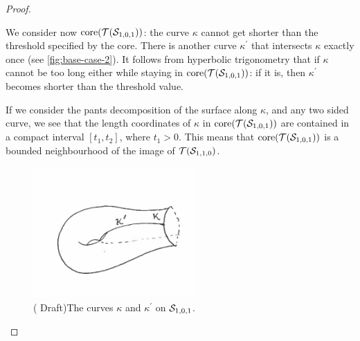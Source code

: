 \documentclass[12pt, reqno]{amsart}
\begin{document}
\begin{proof}
\begin{itemize}
    We consider now $\mathrm{core}(\mathcal{T}(\mathcal{S}_{1,0,1}))$: the curve $\kappa$ cannot get shorter than the threshold specified by the core.
    There is another curve $\kappa^{\prime}$ that intersects $\kappa$ exactly once (see \autoref{fig:base-case-2}).
    It follows from hyperbolic trigonometry that if $\kappa$ cannot be too long either while staying in $\mathrm{core}(\mathcal{T}(\mathcal{S}_{1,0,1}))$: if it is, then $\kappa^{\prime}$ becomes shorter than the threshold value.

    If we consider the pants decomposition of the surface along $\kappa$, and any two sided curve, we see that the length coordinates of $\kappa$ in $\mathrm{core}(\mathcal{T}(\mathcal{S}_{1,0,1}))$ are contained in a compact interval $[t_1, t_2]$, where $t_1 > 0$.
    This means that $\mathrm{core}(\mathcal{T}(\mathcal{S}_{1,0,1}))$ is a bounded neighbourhood of the image of $\mathcal{T}(\mathcal{S}_{1,1,0})$.
    \begin{figure}[h]
      \centering
      \includegraphics[height=5cm]{images/s101-draft.png}
      \caption{({\color{red} Draft})The curves $\kappa$ and $\kappa^{\prime}$ on $\mathcal{S}_{1,0,1}$.}
      \label{fig:base-case-2}
    \end{figure}


\end{itemize}
\end{proof}
\end{document}
